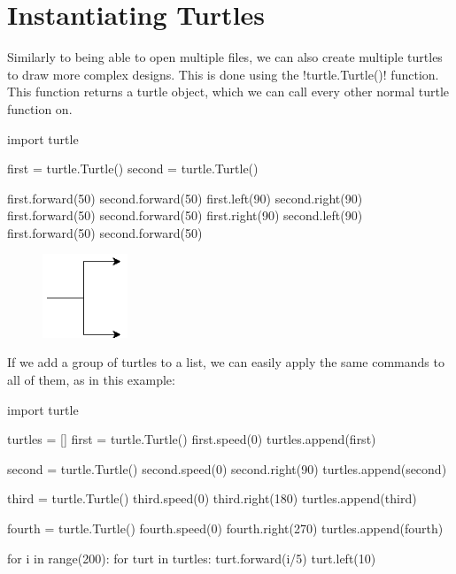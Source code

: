 \documentclass[11pt]{cselabheader}
\begin{document}
\pagebreak
\section{Instantiating Turtles}
Similarly to being able to open multiple files, we can also create multiple
turtles to draw more complex designs. This is done using the
\pythoninline!turtle.Turtle()! function. This function returns a turtle object,
which we can call every other normal turtle function on.

\begin{python3code}
import turtle

first = turtle.Turtle()
second = turtle.Turtle()

first.forward(50)
second.forward(50)
first.left(90)
second.right(90)
first.forward(50)
second.forward(50)
first.right(90)
second.left(90)
first.forward(50)
second.forward(50)
\end{python3code}

\begin{figure}[h]
  \centering
  \includegraphics[width=1.0in]{img/turtle_prong}
\end{figure}

If we add a group of turtles to a list, we can easily apply the same commands to all of them, as in this example:

\begin{python3code}
import turtle

turtles = []
first = turtle.Turtle()
first.speed(0)
turtles.append(first)

second = turtle.Turtle()
second.speed(0)
second.right(90)
turtles.append(second)

third = turtle.Turtle()
third.speed(0)
third.right(180)
turtles.append(third)

fourth = turtle.Turtle()
fourth.speed(0)
fourth.right(270)
turtles.append(fourth)

for i in range(200):
    for turt in turtles:
        turt.forward(i/5)
        turt.left(10)
\end{python3code}
\end{document}
